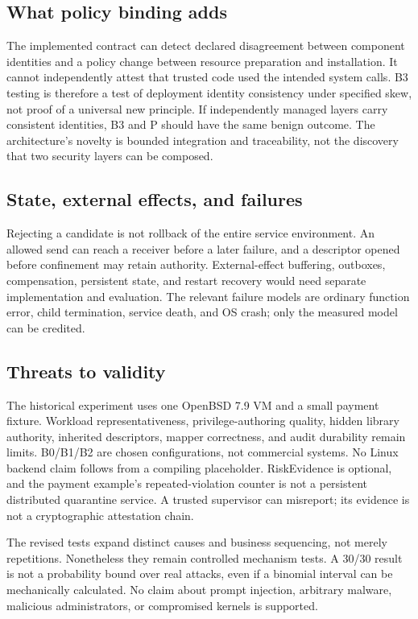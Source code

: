 \documentclass[electronics,article,submit,pdftex,moreauthors]{Definitions/mdpi}
\begin{document}
\subsection{What policy binding adds}
The implemented contract can detect declared disagreement between component identities and a policy change between resource preparation and installation. It cannot independently attest that trusted code used the intended system calls. B3 testing is therefore a test of deployment identity consistency under specified skew, not proof of a universal new principle. If independently managed layers carry consistent identities, B3 and P should have the same benign outcome. The architecture's novelty is bounded integration and traceability, not the discovery that two security layers can be composed.

\subsection{State, external effects, and failures}
Rejecting a candidate is not rollback of the entire service environment. An allowed send can reach a receiver before a later failure, and a descriptor opened before confinement may retain authority. External-effect buffering, outboxes, compensation, persistent state, and restart recovery would need separate implementation and evaluation. The relevant failure models are ordinary function error, child termination, service death, and OS crash; only the measured model can be credited.

\subsection{Threats to validity}
The historical experiment uses one OpenBSD 7.9 VM and a small payment fixture. Workload representativeness, privilege-authoring quality, hidden library authority, inherited descriptors, mapper correctness, and audit durability remain limits. B0/B1/B2 are chosen configurations, not commercial systems. No Linux backend claim follows from a compiling placeholder. RiskEvidence is optional, and the payment example's repeated-violation counter is not a persistent distributed quarantine service. A trusted supervisor can misreport; its evidence is not a cryptographic attestation chain.

The revised tests expand distinct causes and business sequencing, not merely repetitions. Nonetheless they remain controlled mechanism tests. A 30/30 result is not a probability bound over real attacks, even if a binomial interval can be mechanically calculated. No claim about prompt injection, arbitrary malware, malicious administrators, or compromised kernels is supported.
\end{document}
